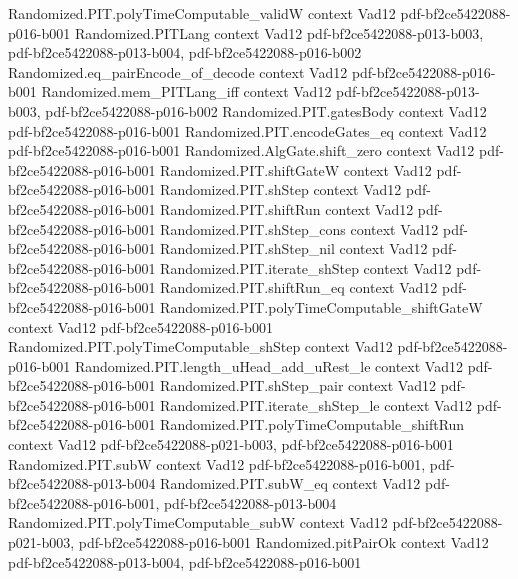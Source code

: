 \begin{theorem}
\proofstep
  {Randomized.PIT.polyTimeComputable_validW}
  {context}
  {Vad12}
  {pdf-bf2ce5422088-p016-b001}
\proofstep
  {Randomized.PITLang}
  {context}
  {Vad12}
  {pdf-bf2ce5422088-p013-b003,
    pdf-bf2ce5422088-p013-b004,
    pdf-bf2ce5422088-p016-b002}
\proofstep
  {Randomized.eq_pairEncode_of_decode}
  {context}
  {Vad12}
  {pdf-bf2ce5422088-p016-b001}
\proofstep
  {Randomized.mem_PITLang_iff}
  {context}
  {Vad12}
  {pdf-bf2ce5422088-p013-b003,
    pdf-bf2ce5422088-p016-b002}
\proofstep
  {Randomized.PIT.gatesBody}
  {context}
  {Vad12}
  {pdf-bf2ce5422088-p016-b001}
\proofstep
  {Randomized.PIT.encodeGates_eq}
  {context}
  {Vad12}
  {pdf-bf2ce5422088-p016-b001}
\proofstep
  {Randomized.AlgGate.shift_zero}
  {context}
  {Vad12}
  {pdf-bf2ce5422088-p016-b001}
\proofstep
  {Randomized.PIT.shiftGateW}
  {context}
  {Vad12}
  {pdf-bf2ce5422088-p016-b001}
\proofstep
  {Randomized.PIT.shStep}
  {context}
  {Vad12}
  {pdf-bf2ce5422088-p016-b001}
\proofstep
  {Randomized.PIT.shiftRun}
  {context}
  {Vad12}
  {pdf-bf2ce5422088-p016-b001}
\proofstep
  {Randomized.PIT.shStep_cons}
  {context}
  {Vad12}
  {pdf-bf2ce5422088-p016-b001}
\proofstep
  {Randomized.PIT.shStep_nil}
  {context}
  {Vad12}
  {pdf-bf2ce5422088-p016-b001}
\proofstep
  {Randomized.PIT.iterate_shStep}
  {context}
  {Vad12}
  {pdf-bf2ce5422088-p016-b001}
\proofstep
  {Randomized.PIT.shiftRun_eq}
  {context}
  {Vad12}
  {pdf-bf2ce5422088-p016-b001}
\proofstep
  {Randomized.PIT.polyTimeComputable_shiftGateW}
  {context}
  {Vad12}
  {pdf-bf2ce5422088-p016-b001}
\proofstep
  {Randomized.PIT.polyTimeComputable_shStep}
  {context}
  {Vad12}
  {pdf-bf2ce5422088-p016-b001}
\proofstep
  {Randomized.PIT.length_uHead_add_uRest_le}
  {context}
  {Vad12}
  {pdf-bf2ce5422088-p016-b001}
\proofstep
  {Randomized.PIT.shStep_pair}
  {context}
  {Vad12}
  {pdf-bf2ce5422088-p016-b001}
\proofstep
  {Randomized.PIT.iterate_shStep_le}
  {context}
  {Vad12}
  {pdf-bf2ce5422088-p016-b001}
\proofstep
  {Randomized.PIT.polyTimeComputable_shiftRun}
  {context}
  {Vad12}
  {pdf-bf2ce5422088-p021-b003,
    pdf-bf2ce5422088-p016-b001}
\proofstep
  {Randomized.PIT.subW}
  {context}
  {Vad12}
  {pdf-bf2ce5422088-p016-b001,
    pdf-bf2ce5422088-p013-b004}
\proofstep
  {Randomized.PIT.subW_eq}
  {context}
  {Vad12}
  {pdf-bf2ce5422088-p016-b001,
    pdf-bf2ce5422088-p013-b004}
\proofstep
  {Randomized.PIT.polyTimeComputable_subW}
  {context}
  {Vad12}
  {pdf-bf2ce5422088-p021-b003,
    pdf-bf2ce5422088-p016-b001}
\proofstep
  {Randomized.pitPairOk}
  {context}
  {Vad12}
  {pdf-bf2ce5422088-p013-b004,
    pdf-bf2ce5422088-p016-b001}

\end{theorem}
